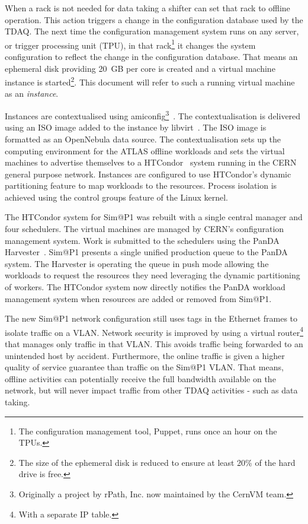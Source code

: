 \documentclass{webofc}
\begin{document}
When a rack is not needed for data taking a shifter can set that rack to
offline operation. This action triggers a change in the configuration database
used by
the TDAQ. The next time the configuration management system runs on any server,
or trigger processing unit (TPU), in that rack\footnote{The configuration
management tool, Puppet, runs once an
hour on the TPUs.} it changes the system configuration to reflect the change
in the configuration database. That means an ephemeral
disk providing 20~\textrm{GB} per core is created and a virtual machine instance
is started\footnote{The size of the ephemeral disk is reduced to ensure at least
20\% of the hard drive is free.}. This document will refer to such a
running virtual machine as an \textit{instance}.

Instances are contextualised using amiconfig\footnote{Originally a
project by rPath, Inc. now maintained by the CernVM team.}~\cite{amiconfig}.
The contextualisation is delivered using an ISO image added to the instance
by libvirt~\cite{libvirt}. The ISO image is formatted as an OpenNebula data
source. The
contextualisation sets up the computing environment for the ATLAS offline
workloads and sets the virtual machines to advertise themselves to a
HTCondor~\cite{condor} system running in the CERN general purpose network.
Instances are configured to use HTCondor's dynamic partitioning feature to
map workloads to the resources. Process isolation is achieved using the control
groups feature of the Linux kernel.

The HTCondor system for Sim@P1 was rebuilt with a single central manager and
four schedulers. The virtual machines are managed by CERN's configuration
management system. Work is submitted to the schedulers using the PanDA
Harvester~\cite{harvester}. Sim@P1 presents a single unified production queue to
the PanDA system. The Harvester is operating the queue in push mode allowing the
workloads to request the resources they need leveraging the dynamic partitioning
of workers.  The HTCondor system now directly notifies the PanDA workload
management system when resources are added or removed from Sim@P1.

The new Sim@P1 network configuration still uses tags in the Ethernet frames to
isolate traffic on a VLAN. Network security is improved by using a virtual
router\footnote{With a separate IP table.} that manages only traffic in that
VLAN. This avoids traffic being forwarded to an unintended host by accident.
Furthermore, the online traffic is given a higher quality of service guarantee
than traffic on the Sim@P1 VLAN. That means, offline activities can potentially
receive the full bandwidth available on the network, but will never impact
traffic from other TDAQ activities - such as data taking.
\end{document}
